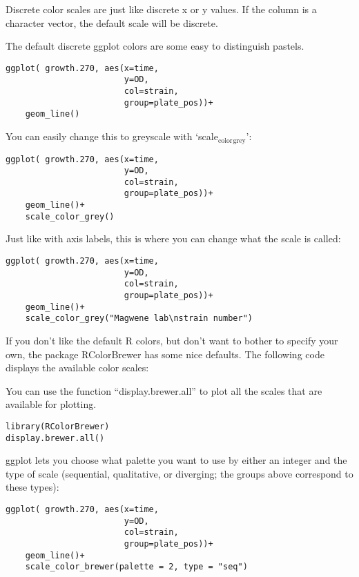 \documentclass[11pt]{article}
\begin{document}
Discrete color scales are just like discrete x or y values. If the
column is a character vector, the default scale will be discrete.

The default discrete ggplot colors are some easy to distinguish pastels.

\begin{verbatim}
ggplot( growth.270, aes(x=time,
                        y=OD,
                        col=strain,
                        group=plate_pos))+
    geom_line()
\end{verbatim}


You can easily change this to greyscale with `scale$_{\mathrm{color}}$$_{\mathrm{grey}}$':

\begin{verbatim}
ggplot( growth.270, aes(x=time,
                        y=OD,
                        col=strain,
                        group=plate_pos))+
    geom_line()+
    scale_color_grey()
\end{verbatim}


Just like with axis labels, this is where you can change what the
scale is called:

\begin{verbatim}
ggplot( growth.270, aes(x=time,
                        y=OD,
                        col=strain,
                        group=plate_pos))+
    geom_line()+
    scale_color_grey("Magwene lab\nstrain number")
\end{verbatim}



If you don't like the default R colors, but don't want to bother to
specify your own, the package RColorBrewer has some nice defaults. The
following code displays the available color scales:

You can use the function ``display.brewer.all'' to plot all the scales
that are available for plotting.

\begin{verbatim}
library(RColorBrewer)
display.brewer.all()
\end{verbatim}


ggplot lets you choose what palette you want to use by either an
integer and the type of scale (sequential, qualitative, or diverging;
the groups above correspond to these types):

\begin{verbatim}
ggplot( growth.270, aes(x=time,
                        y=OD,
                        col=strain,
                        group=plate_pos))+
    geom_line()+
    scale_color_brewer(palette = 2, type = "seq")
\end{verbatim}
\end{document}
